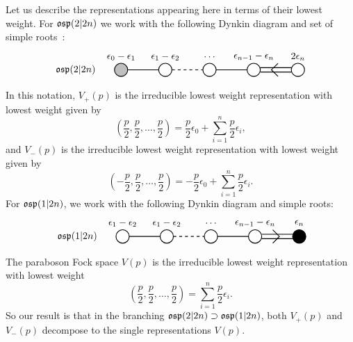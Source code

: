 \documentclass{SciPost}
\begin{document}
Let us describe the representations appearing here in terms of their lowest weight.
For $\mathfrak{osp}(2|2n)$ we work with the following Dynkin diagram and set of simple roots~\cite{Kac,Frappat}:
\[
\begin{tikzpicture}[scale=.8]
    \draw (-1,0) node[anchor=east]  {$\osp(2|2n)$};
		\draw[thick,fill=lightgray] (0 cm,0) circle (0.3 cm); 
    \foreach \x in {1,...,3}
    \draw[xshift=\x cm,thick] (\x cm,0) circle (.3cm);
    \draw[xshift=4 cm,thick] (4 cm, 0) circle (.3 cm);
    \draw[thick] (0.3 cm,0) -- +(1.4 cm,0);
		\draw[thick,dashed] (2.3 cm,0) -- +(1.4 cm,0);
		\draw[thick] (4.3 cm,0) -- +(1.4 cm,0);
    \draw[thick] (6.3 cm, .1 cm) -- +(1.4 cm,0);
    \draw[thick] (6.3 cm, -.1 cm) -- +(1.4 cm,0);
		\draw[thick] (7.1 cm,0.3 cm) -- (6.8 cm, 0 cm) -- (7.1 cm, -0.3 cm); %
		\draw (0 cm,0.6 cm) node {$\epsilon_0-\epsilon_1$}; \draw (2 cm,0.6 cm) node {$\epsilon_1-\epsilon_2$}; \draw (4 cm,0.6 cm) node {$\ldots$}; \draw (6 cm,0.6 cm) node {$\epsilon_{n-1}-\epsilon_n$}; \draw (8 cm,0.6 cm) node {$2\epsilon_n$};
  \end{tikzpicture}
\]
In this notation, $V_+(p)$ is the irreducible lowest weight representation with lowest weight given by 
\[
(\frac{p}{2}, \frac{p}{2}, \ldots,\frac{p}{2})=\frac{p}{2}\epsilon_0+\sum_{i=1}^n \frac{p}{2}\epsilon_i,
\]
and $V_-(p)$ is the irreducible lowest weight representation with lowest weight given by 
\[
 (-\frac{p}{2}, \frac{p}{2}, \ldots,\frac{p}{2})=-\frac{p}{2}\epsilon_0+\sum_{i=1}^n \frac{p}{2}\epsilon_i.
\]
For $\mathfrak{osp}(1|2n)$, we work with the following Dynkin diagram and simple roots:
\[
\begin{tikzpicture}[scale=.8]
    \draw (-1,0) node[anchor=east]  {$\osp(1|2n)$};
    \foreach \x in {0,...,3}
    \draw[xshift=\x cm,thick] (\x cm,0) circle (.3cm);
    \draw[xshift=4 cm,thick,fill=black] (4 cm, 0) circle (.3 cm);
    \draw[thick] (0.3 cm,0) -- +(1.4 cm,0);
		\draw[thick,dashed] (2.3 cm,0) -- +(1.4 cm,0);
		\draw[thick] (4.3 cm,0) -- +(1.4 cm,0);
    \draw[thick] (6.3 cm, .1 cm) -- +(1.4 cm,0);
    \draw[thick] (6.3 cm, -.1 cm) -- +(1.4 cm,0);
		\draw[thick] (6.8 cm,0.3 cm) -- (7.1 cm, 0 cm) -- (6.8 cm, -0.3 cm); %
		\draw (0 cm,0.6 cm) node {$\epsilon_1-\epsilon_2$}; \draw (2 cm,0.6 cm) node {$\epsilon_1-\epsilon_2$}; \draw (4 cm,0.6 cm) node {$\ldots$}; \draw (6 cm,0.6 cm) node {$\epsilon_{n-1}-\epsilon_n$}; \draw (8 cm,0.6 cm) node {$\epsilon_n$};
  \end{tikzpicture}
\]
The paraboson Fock space $V(p)$ is the irreducible lowest weight representation with lowest weight
\[
 (\frac{p}{2}, \frac{p}{2}, \ldots,\frac{p}{2})=\sum_{i=1}^n \frac{p}{2}\epsilon_i.
\]
So our result is that in the branching $\mathfrak{osp}(2|2n) \supset \mathfrak{osp}(1|2n)$, both $V_+(p)$ and $V_-(p)$ decompose to the single representations $V(p)$.
\end{document}
